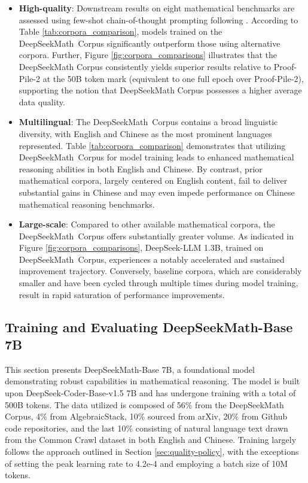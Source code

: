 \begin{itemize}[topsep=0pt]
\begin{itemize}[topsep=0pt]
    \item \textbf{High-quality}:
    Downstream results on eight mathematical benchmarks are assessed using few-shot chain-of-thought prompting following \cite{cot}. According to Table \ref{tab:corpora_comparison}, models trained on the DeepSeekMath~Corpus significantly outperform those using alternative corpora. Further, Figure \ref{fig:corpora_comparisons} illustrates that the DeepSeekMath Corpus consistently yields superior results relative to Proof-Pile-2 at the 50B token mark (equivalent to one full epoch over Proof-Pile-2), supporting the notion that DeepSeekMath Corpus possesses a higher average data quality.
    \item \textbf{Multilingual}:
    The DeepSeekMath~Corpus contains a broad linguistic diversity, with English and Chinese as the most prominent languages represented. Table \ref{tab:corpora_comparison} demonstrates that utilizing DeepSeekMath~Corpus for model training leads to enhanced mathematical reasoning abilities in both English and Chinese. By contrast, prior mathematical corpora, largely centered on English content, fail to deliver substantial gains in Chinese and may even impede performance on Chinese mathematical reasoning benchmarks.
    \item \textbf{Large-scale}:
    Compared to other available mathematical corpora, the DeepSeekMath~Corpus offers substantially greater volume. As indicated in Figure \ref{fig:corpora_comparisons}, DeepSeek-LLM 1.3B, trained on DeepSeekMath~Corpus, experiences a notably accelerated and sustained improvement trajectory. Conversely, baseline corpora, which are considerably smaller and have been cycled through multiple times during model training, result in rapid saturation of performance improvements.
\end{itemize}

\subsection{Training and Evaluating DeepSeekMath-Base 7B}

This section presents DeepSeekMath-Base 7B, a foundational model demonstrating robust capabilities in mathematical reasoning. The model is built upon DeepSeek-Coder-Base-v1.5 7B \citep{deepseek-coder} and has undergone training with a total of 500B tokens. The data utilized is composed of 56\% from the DeepSeekMath Corpus, 4\% from AlgebraicStack, 10\% sourced from arXiv, 20\% from Github code repositories, and the last 10\% consisting of natural language text drawn from the Common Crawl dataset in both English and Chinese. Training largely follows the approach outlined in Section \ref{sec:quality-policy}, with the exceptions of setting the peak learning rate to 4.2e-4 and employing a batch size of 10M tokens.


\end{itemize}
